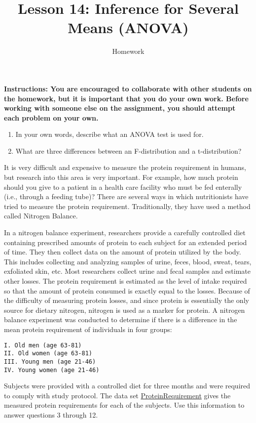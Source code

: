 \documentclass[]{article}
\title{Lesson 14: Inference for Several Means (ANOVA)}
\author{Homework}
\date{}
\begin{document}
\maketitle

\textbf{Instructions: You are encouraged to collaborate with other
students on the homework, but it is important that you do your own work.
Before working with someone else on the assignment, you should attempt
each problem on your own.}

\begin{enumerate}
\def\labelenumi{\arabic{enumi}.}
\item
  In your own words, describe what an ANOVA test is used for.
\item
  What are three differences between an F-distribution and a
  t-distribution?
\end{enumerate}

It is very difficult and expensive to measure the protein requirement in
humans, but research into this area is very important. For example, how
much protein should you give to a patient in a health care facility who
must be fed enterally (i.e., through a feeding tube)? There are several
ways in which nutritionists have tried to measure the protein
requirement. Traditionally, they have used a method called Nitrogen
Balance.

In a nitrogen balance experiment, researchers provide a carefully
controlled diet containing prescribed amounts of protein to each subject
for an extended period of time. They then collect data on the amount of
protein utilized by the body. This includes collecting and analyzing
samples of urine, feces, blood, sweat, tears, exfoliated skin, etc. Most
researchers collect urine and fecal samples and estimate other losses.
The protein requirement is estimated as the level of intake required so
that the amount of protein consumed is exactly equal to the losses.
Because of the difficulty of measuring protein losses, and since protein
is essentially the only source for dietary nitrogen, nitrogen is used as
a marker for protein. A nitrogen balance experiment was conducted to
determine if there is a difference in the mean protein requirement of
individuals in four groups:

\begin{verbatim}
I. Old men (age 63-81)
II. Old women (age 63-81) 
III. Young men (age 21-46)
IV. Young women (age 21-46)
\end{verbatim}

Subjects were provided with a controlled diet for three months and were
required to comply with study protocol. The data set
\href{http://statistics.byuimath.com/index.php?title=Data}{ProteinRequirement}
gives the measured protein requirements for each of the subjects. Use
this information to answer questions 3 through 12.
\end{document}
